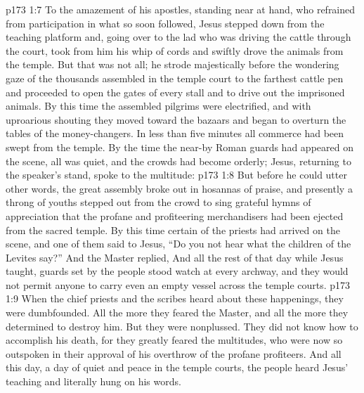 \vs p173 1:7 To the amazement of his apostles, standing near at hand, who refrained from participation in what so soon followed, Jesus stepped down from the teaching platform and, going over to the lad who was driving the cattle through the court, took from him his whip of cords and swiftly drove the animals from the temple. But that was not all; he strode majestically before the wondering gaze of the thousands assembled in the temple court to the farthest cattle pen and proceeded to open the gates of every stall and to drive out the imprisoned animals. By this time the assembled pilgrims were electrified, and with uproarious shouting they moved toward the bazaars and began to overturn the tables of the money\hyp{}changers. In less than five minutes all commerce had been swept from the temple. By the time the near\hyp{}by Roman guards had appeared on the scene, all was quiet, and the crowds had become orderly; Jesus, returning to the speaker’s stand, spoke to the multitude: 
\vs p173 1:8 But before he could utter other words, the great assembly broke out in hosannas of praise, and presently a throng of youths stepped out from the crowd to sing grateful hymns of appreciation that the profane and profiteering merchandisers had been ejected from the sacred temple. By this time certain of the priests had arrived on the scene, and one of them said to Jesus, “Do you not hear what the children of the Levites say?” And the Master replied,  And all the rest of that day while Jesus taught, guards set by the people stood watch at every archway, and they would not permit anyone to carry even an empty vessel across the temple courts.
\vs p173 1:9 \pc When the chief priests and the scribes heard about these happenings, they were dumbfounded. All the more they feared the Master, and all the more they determined to destroy him. But they were nonplussed. They did not know how to accomplish his death, for they greatly feared the multitudes, who were now so outspoken in their approval of his overthrow of the profane profiteers. And all this day, a day of quiet and peace in the temple courts, the people heard Jesus’ teaching and literally hung on his words.
